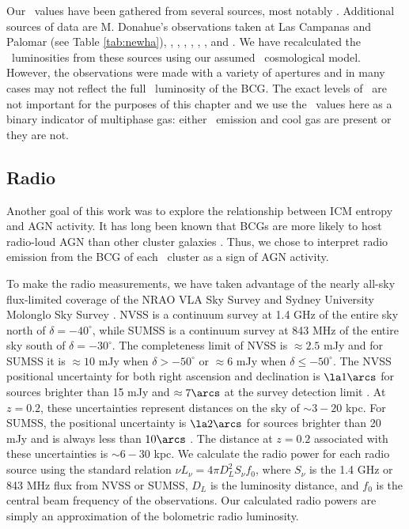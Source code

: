 Our \halpha\ values have been gathered from several sources, most
notably \cite{crawford99}. Additional sources of data are M. Donahue's
observations taken at Las Campanas and Palomar (see Table
\ref{tab:newha}), \cite{heckman89}, \cite{dsg92}, \cite{lawrence96},
\cite{1996AJ....112.1390V}, \cite{white97},
\cite{2005MNRAS.363..216C}, and \cite{quillen08}. We have recalculated
the \halpha\ luminosities from these sources using our assumed
\LCDM\ cosmological model.  However, the observations were made with a
variety of apertures and in many cases may not reflect the full
\halpha\ luminosity of the BCG. The exact levels of \lha\ are not
important for the purposes of this chapter and we use the \lha\ values
here as a binary indicator of multiphase gas: either \halpha\ emission
and cool gas are present or they are not.

\subsection{Radio}
\label{sec:haradradio}

Another goal of this work was to explore the relationship between ICM
entropy and AGN activity. It has long been known that BCGs are more
likely to host radio-loud AGN than other cluster galaxies
\citep{burns81, valentijn83, burns90}. Thus, we chose to interpret
radio emission from the BCG of each \accept\ cluster as a sign of AGN
activity.

To make the radio measurements, we have taken advantage of the nearly
all-sky flux-limited coverage of the NRAO VLA Sky Survey
\citep[NVSS,][]{nvss} and Sydney University Molonglo Sky Survey
\citep[SUMSS,][]{sumss1, sumss2}. NVSS is a continuum survey at 1.4 GHz
of the entire sky north of $\delta = -40^{\circ}$, while SUMSS is a
continuum survey at 843 MHz of the entire sky south of $\delta =
-30^{\circ}$. The completeness limit of NVSS is $\approx 2.5$ mJy and
for SUMSS it is $\approx 10$ mJy when $\delta > -50^{\circ}$ or
$\approx 6$ mJy when $\delta \leq -50^{\circ}$. The NVSS positional
uncertainty for both right ascension and declination is $\la 1\arcs$
for sources brighter than 15 mJy and $\approx 7\arcs$ at the survey
detection limit \citep{nvss}. At $z=0.2$, these uncertainties
represent distances on the sky of $\sim3-20$ kpc. For SUMSS, the
positional uncertainty is $\la 2\arcs$ for sources brighter than 20
mJy and is always less than $10\arcs$ \citep{sumss1,sumss2}. The
distance at $z=0.2$ associated with these uncertainties is $\sim6-30$
kpc. We calculate the radio power for each radio source using the
standard relation $\nu L_{\nu} = 4 \pi D_L^2 S_{\nu} f_0$, where
$S_{\nu}$ is the 1.4 GHz or 843 MHz flux from NVSS or SUMSS, $D_L$ is
the luminosity distance, and $f_0$ is the central beam frequency of
the observations. Our calculated radio powers are simply an
approximation of the bolometric radio luminosity.

